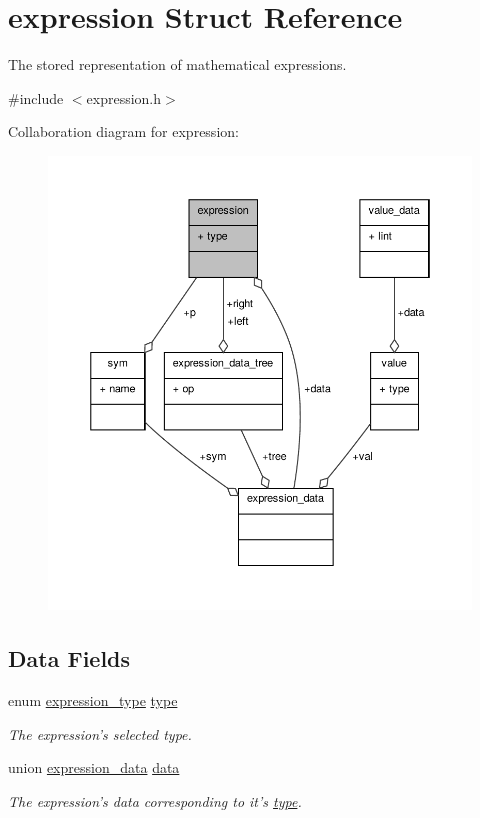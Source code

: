 \hypertarget{structexpression}{\section{expression Struct Reference}
\label{structexpression}
}


The stored representation of mathematical expressions.  




{\ttfamily \#include $<$expression.\+h$>$}



Collaboration diagram for expression\+:\nopagebreak
\begin{figure}[H]
\begin{center}
\leavevmode
\includegraphics[width=350pt]{structexpression__coll__graph}
\end{center}
\end{figure}
\subsection*{Data Fields}
\begin{DoxyCompactItemize}
\item 
enum \hyperlink{expression_8h_a5a6601c4e142145f0e87051cb21ece0f}{expression\+\_\+type} \hyperlink{structexpression_a6c50b44c70231c1b3752f8516daa967c}{type}
\begin{DoxyCompactList}\small\item\em The expression's selected type. \end{DoxyCompactList}\item 
union \hyperlink{unionexpression__data}{expression\+\_\+data} \hyperlink{structexpression_addb4bda6d311d21f3fd2bfdd12fc70ab}{data}
\begin{DoxyCompactList}\small\item\em The expression's data corresponding to it's \hyperlink{structexpression_a6c50b44c70231c1b3752f8516daa967c}{type}. \end{DoxyCompactList}\end{DoxyCompactItemize}


